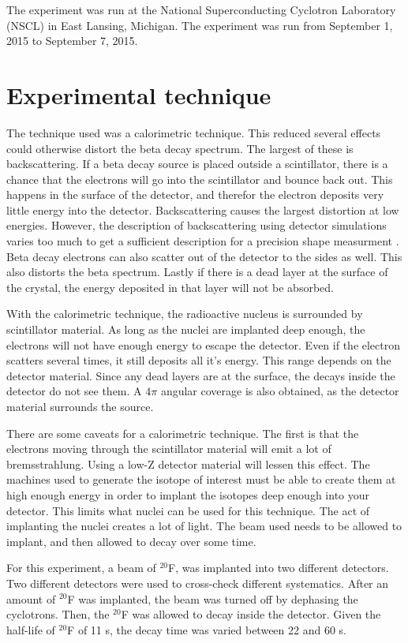 The experiment was run at the National Superconducting Cyclotron Laboratory (NSCL) in East Lansing, Michigan. 
The experiment was run from September 1, 2015 to September 7, 2015.

\section{Experimental technique}
The technique used was a calorimetric technique.
This reduced several effects could otherwise distort the beta decay spectrum.
The largest of these is backscattering.
If a beta decay source is placed outside a scintillator, there is a chance that the electrons will go into the scintillator and bounce back out.
This happens in the surface of the detector, and therefor the electron deposits very little energy into the detector. 
Backscattering causes the largest distortion at low energies.
However, the description of backscattering using detector simulations varies too much to get a sufficient description for a precision shape measurment \cite{ref:Huy18}.
Beta decay electrons can also scatter out of the detector to the sides as well. 
This also distorts the beta spectrum.
Lastly if there is a dead layer at the surface of the crystal, the energy deposited in that layer will not be absorbed.

With the calorimetric technique, the radioactive nucleus is surrounded by scintillator material.
As long as the nuclei are implanted deep enough, the electrons will not have enough energy to escape the detector.
Even if the electron scatters several times, it still deposits all it's energy.
This range depends on the detector material.
Since any dead layers are at the surface, the decays inside the detector do not see them.
A $4\pi$ angular coverage is also obtained, as the detector material surrounds the source.

There are some caveats for a calorimetric technique. 
The first is that the electrons moving through the scintillator material will emit a lot of bremsstrahlung.
Using a low-Z detector material will lessen this effect.
The machines used to generate the isotope of interest must be able to create them at high enough energy in order to implant the isotopes deep enough into your detector.
This limits what nuclei can be used for this technique.
The act of implanting the nuclei creates a lot of light. 
The beam used needs to be allowed to implant, and then allowed to decay over some time.

For this experiment, a  beam of  $^{20}$F, was implanted into two different detectors.
Two different detectors were used to cross-check different systematics.
After an amount of $^{20}$F was implanted, the beam was turned off by dephasing the cyclotrons.
Then, the $^{20}$F was allowed to decay inside the detector. 
Given the half-life of $^{20}$F of 11 s, the decay time was varied between 22 and 60 s.

